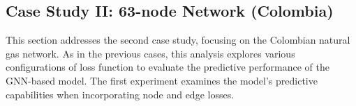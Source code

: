 %






\subsection{Case Study II: 63-node Network (Colombia)}


This section addresses the second case study, focusing on the Colombian natural gas network. As in the previous cases, this analysis explores various configurations of loss function to evaluate the predictive performance of the GNN-based model. The first experiment examines the model's predictive capabilities when incorporating node and edge losses.

